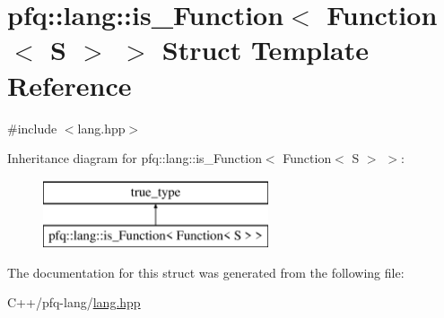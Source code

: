 \hypertarget{structpfq_1_1lang_1_1is__Function_3_01Function_3_01S_01_4_01_4}{\section{pfq\+:\+:lang\+:\+:is\+\_\+\+Function$<$ Function$<$ S $>$ $>$ Struct Template Reference}
\label{structpfq_1_1lang_1_1is__Function_3_01Function_3_01S_01_4_01_4}
}


{\ttfamily \#include $<$lang.\+hpp$>$}

Inheritance diagram for pfq\+:\+:lang\+:\+:is\+\_\+\+Function$<$ Function$<$ S $>$ $>$\+:\begin{figure}[H]
\begin{center}
\leavevmode
\includegraphics[height=2.000000cm]{structpfq_1_1lang_1_1is__Function_3_01Function_3_01S_01_4_01_4}
\end{center}
\end{figure}


The documentation for this struct was generated from the following file\+:\begin{DoxyCompactItemize}
\item 
C++/pfq-\/lang/\hyperlink{lang_8hpp}{lang.\+hpp}\end{DoxyCompactItemize}
